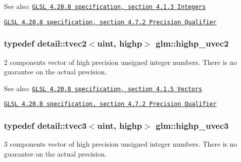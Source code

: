 \begin{Desc}
\item[See also:]\href{http://www.opengl.org/registry/doc/GLSLangSpec.4.20.8.pdf}{\tt GLSL 4.20.8 specification, section 4.1.3 Integers} 

\href{http://www.opengl.org/registry/doc/GLSLangSpec.4.20.8.pdf}{\tt GLSL 4.20.8 specification, section 4.7.2 Precision Qualifier} \end{Desc}
\hypertarget{group__core__precision_gaf92be4c1fca33cff90c1ed15b521c79}{
\subsubsection[highp\_\-uvec2]{\setlength{\rightskip}{0pt plus 5cm}typedef detail::tvec2$<$uint, highp$>$ {\bf glm::highp\_\-uvec2}}}
\label{group__core__precision_gaf92be4c1fca33cff90c1ed15b521c79}


2 components vector of high precision unsigned integer numbers. There is no guarantee on the actual precision.

\begin{Desc}
\item[See also:]\href{http://www.opengl.org/registry/doc/GLSLangSpec.4.20.8.pdf}{\tt GLSL 4.20.8 specification, section 4.1.5 Vectors} 

\href{http://www.opengl.org/registry/doc/GLSLangSpec.4.20.8.pdf}{\tt GLSL 4.20.8 specification, section 4.7.2 Precision Qualifier} \end{Desc}
\hypertarget{group__core__precision_g66d0e4ae1742ede2eb32bf0bfedd7474}{
\subsubsection[highp\_\-uvec3]{\setlength{\rightskip}{0pt plus 5cm}typedef detail::tvec3$<$uint, highp$>$ {\bf glm::highp\_\-uvec3}}}
\label{group__core__precision_g66d0e4ae1742ede2eb32bf0bfedd7474}


3 components vector of high precision unsigned integer numbers. There is no guarantee on the actual precision.

